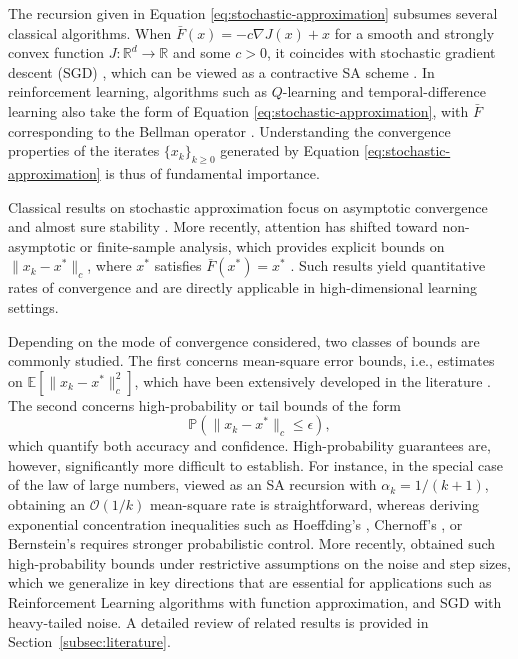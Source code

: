 \documentclass{article}
\begin{document}
The recursion given in Equation \eqref{eq:stochastic-approximation} subsumes several classical algorithms. When $\bar{F}(x) = -c\nabla J(x) + x$ for a smooth and strongly convex function $J:\mathbb{R}^d\to\mathbb{R}$ and some $c>0$, it coincides with stochastic gradient descent (SGD) \citep{bottou2018optimization,lan2020first}, which can be viewed as a contractive SA scheme \citep{ryu2016primer}. In reinforcement learning, algorithms such as $Q$-learning \citep{watkins1992q} and temporal-difference learning \citep{sutton1988learning} also take the form of Equation \eqref{eq:stochastic-approximation}, with $\bar{F}$ corresponding to the Bellman operator \citep{bertsekas1996neuro,bellman1957dynamic}. Understanding the convergence properties of the iterates $\{x_k\}_{k\geq 0}$ generated by Equation \eqref{eq:stochastic-approximation} is thus of fundamental importance.

Classical results on stochastic approximation focus on asymptotic convergence and almost sure stability \citep{robbins1951stochastic,tsitsiklis1994asynchronous,mokkadem2006convergence,borkar2009stochastic,kushner2012stochastic}. More recently, attention has shifted toward non-asymptotic or finite-sample analysis, which provides explicit bounds on $\|x_k - x^*\|_c$, where $x^*$ satisfies $\bar{F}(x^*) = x^*$ \citep{bhandari2018finite,srikant2019finite,chen2020finite}. Such results yield quantitative rates of convergence and are directly applicable in high-dimensional learning settings.

Depending on the mode of convergence considered, two classes of bounds are commonly studied. The first concerns mean-square error bounds, i.e., estimates on $\mathbb{E}[\|x_k - x^*\|_c^2]$, which have been extensively developed in the literature \citep{srikant2019finite,bhandari2018finite,chen2019finitesample,chen2020finite,wainwrightHDS}. The second concerns high-probability or tail bounds of the form
\[
\mathbb{P}(\|x_k - x^*\|_c \le \epsilon),
\]
which quantify both accuracy and confidence. High-probability guarantees are, however, significantly more difficult to establish. For instance, in the special case of the law of large numbers, viewed as an SA recursion with $\alpha_k = 1/(k+1)$, obtaining an $\mathcal{O}(1/k)$ mean-square rate is straightforward, whereas deriving exponential concentration inequalities such as Hoeffding’s \citep{hoeffding1994probability}, Chernoff’s \citep{chernoff1952measure}, or Bernstein’s \citep{bernstein1924modification} requires stronger probabilistic control. More recently, \cite{chen2025concentration} obtained such high-probability bounds under restrictive assumptions on the noise and step sizes, which we generalize in key directions that are essential for applications such as Reinforcement Learning algorithms with function approximation, and SGD with heavy-tailed noise. A detailed review of related results is provided in Section~\ref{subsec:literature}.
\end{document}
